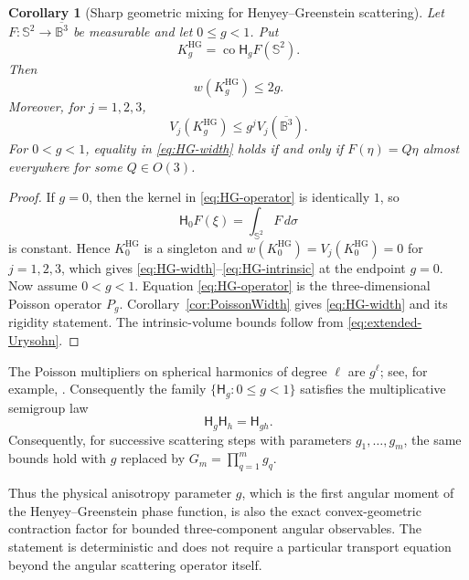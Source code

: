 \documentclass[11pt,reqno]{amsart}
\newtheorem{corollary}[theorem]{Corollary}
\theoremstyle{remark}
\begin{document}
\begin{corollary}[Sharp geometric mixing for Henyey--Greenstein scattering]
\label{cor:HG}
Let $F:\mathbb S^2\to\overline{\mathbb B^3}$ be measurable and let
$0\le g<1$.  Put
\[
 K_g^{\mathrm{HG}}
 =
 \operatorname{co}\mathsf H_gF(\mathbb S^2).
\]
Then
\begin{equation}\label{eq:HG-width}
 w(K_g^{\mathrm{HG}})\le2g.
\end{equation}
Moreover, for $j=1,2,3$,
\begin{equation}\label{eq:HG-intrinsic}
 V_j(K_g^{\mathrm{HG}})
 \le
 g^j V_j(\overline{\mathbb B^3}).
\end{equation}
For $0<g<1$, equality in \eqref{eq:HG-width} holds if and only if
$F(\eta)=Q\eta$ almost everywhere for some $Q\in O(3)$.
\end{corollary}

\begin{proof}
If $g=0$, then the kernel in \eqref{eq:HG-operator} is identically $1$, so
\[
 \mathsf H_0F(\xi)=\int_{\mathbb S^2}F\,d\sigma
\]
is constant.  Hence $K_0^{\mathrm{HG}}$ is a singleton and
$w(K_0^{\mathrm{HG}})=V_j(K_0^{\mathrm{HG}})=0$ for $j=1,2,3$, which gives
\eqref{eq:HG-width}--\eqref{eq:HG-intrinsic} at the endpoint $g=0$.
Now assume $0<g<1$.  Equation \eqref{eq:HG-operator} is the
three-dimensional Poisson operator $P_g$.  Corollary~\ref{cor:PoissonWidth}
gives \eqref{eq:HG-width} and its rigidity statement.  The
intrinsic-volume bounds follow from \eqref{eq:extended-Urysohn}.
\end{proof}

The Poisson multipliers on spherical harmonics of degree $\ell$ are
$g^\ell$; see, for example, \cite{AxlerBourdonRamey,DaiXu}.  Consequently
the family $\{\mathsf H_g:0\le g<1\}$ satisfies
the multiplicative semigroup law
\begin{equation}\label{eq:HG-semigroup}
 \mathsf H_g\mathsf H_h=\mathsf H_{gh}.
\end{equation}
Consequently, for successive scattering steps with parameters
$g_1,\ldots,g_m$, the same bounds hold with $g$ replaced by
$G_m=\prod_{q=1}^m g_q$.

Thus the physical anisotropy parameter $g$, which is the first angular
moment of the Henyey--Greenstein phase function, is also the exact
convex-geometric contraction factor for bounded three-component angular
observables.  The statement is deterministic and does not require a
particular transport equation beyond the angular scattering operator
itself.
\end{document}
